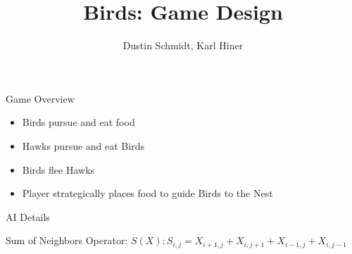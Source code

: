 \documentclass{beamer}
\begin{document}
\title{Birds: Game Design}
\author{Dustin Schmidt, Karl Hiner}
\maketitle

\begin{frame}{Game Overview}
 \begin{itemize}
  \item Birds pursue and eat food
  \item Hawks pursue and eat Birds
  \item Birds flee Hawks
  \item Player strategically places food to guide Birds to the Nest
 \end{itemize}
 

\end{frame}

\begin{frame}{AI Details}

Sum of Neighbors Operator: \( S(X): S_{i,j} = X_{i+1,j} + X_{i,j+1} + X_{i-1,j} + X_{i,j-1} \)
 
 
\end{frame}
\end{document}
